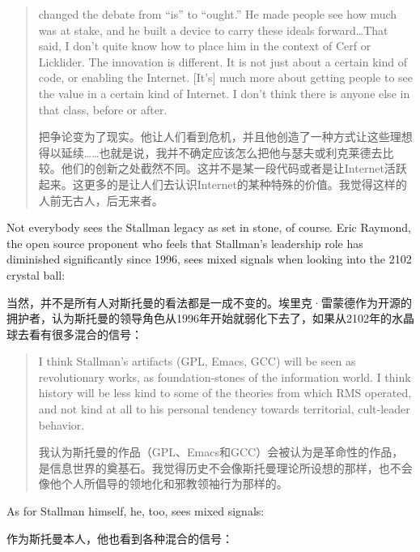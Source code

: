 \begin{quote}
\ifdefined\eng
[Stallman] changed the debate from ``is'' to ``ought.'' He made people see how much was at stake, and he built a device to carry these ideals forward\ldots That said, I don't quite know how to place him in the context of Cerf or Licklider. The innovation is different. It is not just about a certain kind of code, or enabling the Internet. [It's] much more about getting people to see the value in a certain kind of Internet. I don't think there is anyone else in that class, before or after.
\fi

\ifdefined\chs
[斯托曼]把争论变为了现实。他让人们看到危机，并且他创造了一种方式让这些理想得以延续……也就是说，我并不确定应该怎么把他与瑟夫或利克莱德去比较。他们的创新之处截然不同。这并不是某一段代码或者是让Internet活跃起来。这更多的是让人们去认识Internet的某种特殊的价值。我觉得这样的人前无古人，后无来者。
\fi
\end{quote}

\ifdefined\eng
Not everybody sees the Stallman legacy as set in stone, of course. Eric Raymond, the open source proponent who feels that Stallman's leadership role has diminished significantly since 1996, sees mixed signals when looking into the 2102 crystal ball:
\fi

\ifdefined\chs
当然，并不是所有人对斯托曼的看法都是一成不变的。埃里克·雷蒙德作为开源的拥护者，认为斯托曼的领导角色从1996年开始就弱化下去了，如果从2102年的水晶球去看有很多混合的信号：
\fi

\begin{quote}
\ifdefined\eng
I think Stallman's artifacts (GPL, Emacs, GCC) will be seen as revolutionary works, as foundation-stones of the information world. I think history will be less kind to some of the theories from which RMS operated, and not kind at all to his personal tendency towards territorial, cult-leader behavior.
\fi

\ifdefined\chs
我认为斯托曼的作品（GPL、Emacs和GCC）会被认为是革命性的作品，是信息世界的奠基石。我觉得历史不会像斯托曼理论所设想的那样，也不会像他个人所倡导的领地化和邪教领袖行为那样的。
\fi
\end{quote}

\ifdefined\eng
As for Stallman himself, he, too, sees mixed signals:
\fi

\ifdefined\chs
作为斯托曼本人，他也看到各种混合的信号：
\fi

